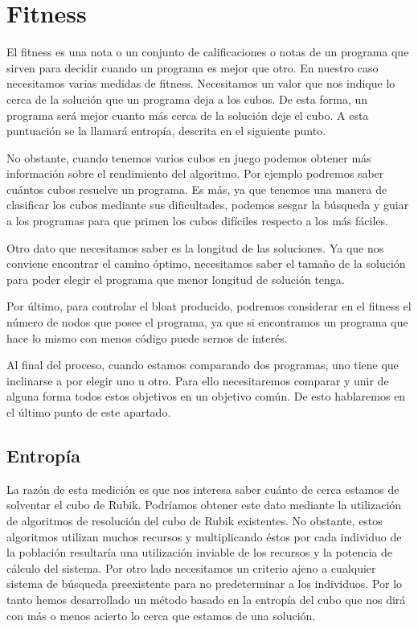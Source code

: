 \clearpage

\section{Fitness}\label{sec:fitness}


El fitness es una nota o un conjunto de calificaciones o notas de un programa que
sirven para decidir cuando un programa es mejor que otro. En nuestro caso
necesitamos varias medidas de fitness. Necesitamos un valor que nos indique lo
cerca de la solución que un programa deja a los cubos. De esta forma, un programa
será mejor cuanto más cerca de la solución deje el cubo. A esta puntuación se la
llamará entropía, descrita en el siguiente punto.

No obstante, cuando tenemos varios cubos en juego podemos obtener más información
sobre el rendimiento del algoritmo. Por ejemplo podremos saber cuántos cubos
resuelve un programa. Es más, ya que tenemos una manera de clasificar los cubos
mediante sus dificultades, podemos sesgar la búsqueda y guiar a los programas
para que primen los cubos difíciles respecto a los más fáciles.

Otro dato que necesitamos saber es la longitud de las soluciones. Ya que nos
conviene encontrar el camino óptimo, necesitamos saber el tamaño de la solución
para poder elegir el programa que menor longitud de solución tenga.

Por último, para controlar el bloat producido, podremos considerar en el fitness
el número de nodos que posee el programa, ya que si encontramos un programa que
hace lo mismo con menos código puede sernos de interés.

Al final del proceso, cuando estamos comparando dos programas, uno tiene que
inclinarse a por elegir uno u otro. Para ello necesitaremos comparar y unir de
alguna forma todos estos objetivos en un objetivo común. De esto hablaremos en el
último punto de este apartado. 

\subsection{Entropía}\label{subsec:entropia}

La razón de esta medición es que nos interesa saber cuánto de cerca estamos de
solventar el cubo de Rubik. Podríamos obtener este dato mediante la utilización
de algoritmos de resolución del cubo de Rubik existentes. No obstante, estos
algoritmos utilizan muchos recursos y multiplicando éstos por cada individuo de
la población resultaría una utilización inviable de los recursos y la potencia de
cálculo del sistema. Por otro lado necesitamos un criterio ajeno a cualquier
sistema de búsqueda preexistente para no predeterminar a los individuos. Por lo
tanto hemos desarrollado un método basado en la entropía del cubo que nos dirá
con más o menos acierto lo cerca que estamos de una solución.

